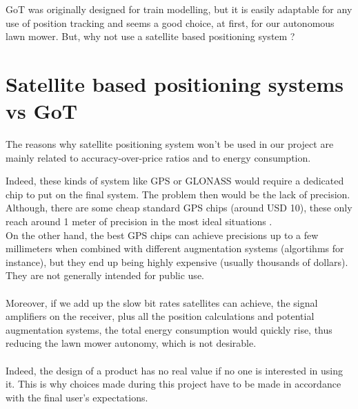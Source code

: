 GoT was originally designed for train modelling, but it is easily adaptable for any use of position tracking and seems a good choice, at first, for our autonomous lawn mower.
But, why not use a satellite based positioning system ?

\nopagebreak

\section{Satellite based positioning systems vs GoT}
The reasons why satellite positioning system won't be used in our project are mainly related to accuracy-over-price ratios and to energy consumption.

\noindent
Indeed, these kinds of system like GPS or GLONASS would require a dedicated chip to put on the final system. The problem then would be the lack of precision. Although, there are some cheap standard GPS chips (around USD 10), these only reach around 1 meter of precision in the most ideal situations \cite{GPSUSWebsiteAccuracy,Miller}. \\
On the other hand, the best GPS chips can achieve precisions up to a few millimeters \cite{GPSUSWebsiteAccuracy} when combined with different augmentation systems (algortihms for instance), but they end up being highly expensive (usually thousands of dollars). They are not generally intended for public use.
 \\\\
\noindent
Moreover, if we add up the slow bit rates satellites can achieve, the signal amplifiers on the receiver, plus all the position calculations and potential augmentation systems, the total energy consumption would quickly rise,  thus reducing the lawn mower autonomy, which is not desirable.\\\\
\noindent
Indeed, the design of a product has no real value if no one is interested in using it. This is why choices made during this project have to be made in accordance with the final user's expectations.\\\\

